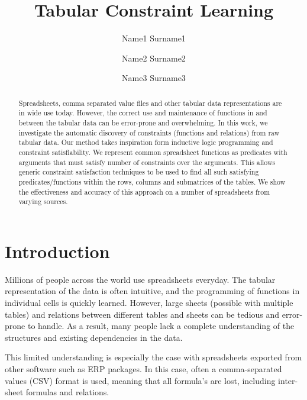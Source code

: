 \documentclass{ecai}
\begin{document}
\title{Tabular Constraint Learning}

\author{Name1 Surname1 \and Name2 Surname2 \and Name3 Surname3 \institute{----------------------} }

\maketitle

\begin{abstract}
Spreadsheets, comma separated value files and other tabular data representations are in wide use today. However, the correct use and maintenance of functions in and between the tabular data can be error-prone and overwhelming. In this work, we investigate the automatic discovery of constraints (functions and relations) from raw tabular data. Our method takes inspiration form inductive logic programming and constraint satisfiability. We represent common spreadsheet functions as predicates with arguments that must satisfy number of constraints over the arguments. This allows generic constraint satisfaction techniques to be used to find all such satisfying predicates/functions within the rows, columns and submatrices of the tables. We show the effectiveness and accuracy of this approach on a number of spreadsheets from varying sources.
\end{abstract}

\section{Introduction}
Millions of people across the world use spreadsheets everyday. The tabular representation of the data is often intuitive, and the programming of functions in individual cells is quickly learned. However, large sheets (possible with multiple tables) and relations between different tables and sheets can be tedious and error-prone to handle. As a result, many people lack a complete understanding of the structures and existing dependencies in the data.

This limited understanding is especially the case with spreadsheets exported from other software such as ERP packages. In this case, often a comma-separated values (CSV) format is used, meaning that all formula's are lost, including inter-sheet formulas and relations.
\end{document}

